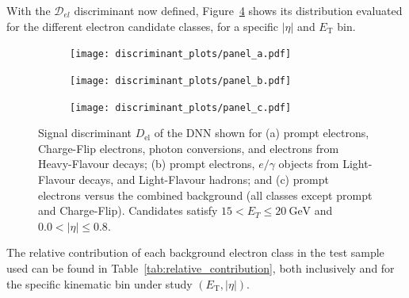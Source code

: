 With the $ \mathcal{D}_{el} $ discriminant now defined, Figure~\ref{fig:dnn_final_disc} shows its distribution evaluated for the different electron candidate classes, for a specific $|\eta|$ and $E_{\text{T}}$ bin.
\begin{figure}[htbp]
  \centering
  \begin{subfigure}[t]{0.48\linewidth}
    \centering
    \texttt{[image: discriminant\_plots/panel\_a.pdf]}
    \caption{}
    \label{fig:dnnDisc_a}
  \end{subfigure}\hfill
  \begin{subfigure}[t]{0.48\linewidth}
    \centering
    \texttt{[image: discriminant\_plots/panel\_b.pdf]}
    \caption{}
    \label{fig:dnnDisc_b}
  \end{subfigure}

  \vspace{0.35cm}

  \begin{subfigure}[t]{0.60\linewidth}
    \centering
    \texttt{[image: discriminant\_plots/panel\_c.pdf]}
    \caption{}
    \label{fig:dnnDisc_c}
  \end{subfigure}

  \caption{Signal discriminant $D_{\mathrm{el}}$ of the DNN shown for (a) prompt electrons,
  Charge-Flip electrons, photon conversions, and electrons from Heavy-Flavour decays;
  (b) prompt electrons, $e/\gamma$ objects from Light-Flavour decays, and Light-Flavour hadrons;
  and (c) prompt electrons versus the combined background (all classes except prompt and Charge-Flip).
  Candidates satisfy $15<E_{T}\leq 20~\mathrm{GeV}$ and $0.0<|\eta|\leq 0.8$.}
  \label{fig:dnn_final_disc}
\end{figure}
The relative contribution of each background electron class in the test sample used can be found in Table~\ref{tab:relative_contribution}, both inclusively and for the specific kinematic bin under study $(E_{\text{T}},|\eta|)$.

